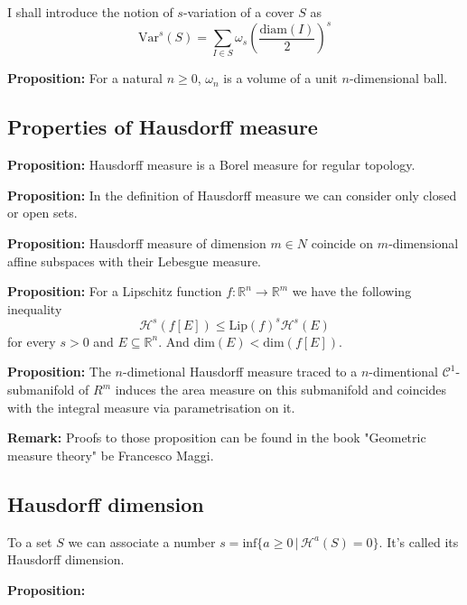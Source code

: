\documentclass{article}
\begin{document}
I shall introduce the notion of $s$-variation of a cover $S$ as
\[\text{Var}^s(S)=\sum_{I\in S}\omega_s\left(\frac{\text{diam}(I)}{2}\right)^s\]

\textbf{Proposition:} For a natural $n\geq 0$, $\omega_n$ is a volume of a unit
$n$-dimensional ball.
\vspace{1ex}

\subsection{Properties of Hausdorff measure}

\textbf{Proposition:} Hausdorff measure is a Borel measure for regular topology.

\vspace{1ex}
\textbf{Proposition:} In the definition of Hausdorff measure we can consider
only closed or open sets.

\vspace{1ex}
\textbf{Proposition:} Hausdorff measure of dimension $m\in N$ coincide on
$m$-dimensional affine subspaces with their Lebesgue measure.

\vspace{1ex}
\textbf{Proposition:} For a Lipschitz function $f:\mathbb{R}^n\rightarrow
\mathbb{R}^m$ we have the following inequality
\[ \mathcal{H}^s(f[E])\leq\text{Lip}(f)^s\mathcal{H}^s(E) \]
for every $s>0$ and $E\subseteq\mathbb{R}^n$. And $\text{dim}(E)<\text{dim}(f[E])$.

\vspace{1ex}
\textbf{Proposition:} The $n$-dimetional Hausdorff measure traced to a
$n$-dimentional $\mathcal{C}^1$-submanifold of $R^m$ induces the area measure
on this submanifold and coincides with the integral measure via parametrisation
on it.

\vspace{1ex}
\textbf{Remark:} Proofs to those proposition can be found in the book "Geometric
measure theory" be Francesco Maggi.
\subsection{Hausdorff dimension}

To a set $S$ we can associate a number $s=\text{inf}\{a\geq 0\,|\,\mathcal{H}^a
(S)=0\}$. It's called its Hausdorff dimension.

\vspace{1ex}
\textbf{Proposition:}
\end{document}
